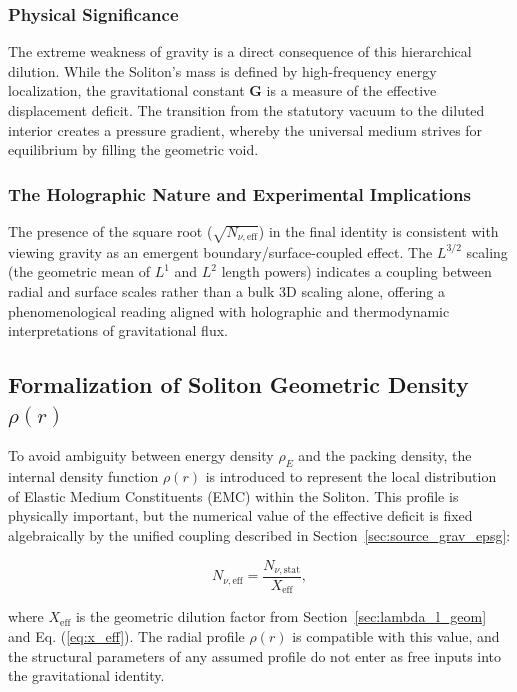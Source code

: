 \documentclass[10pt,a4paper]{article}
\begin{document}
\subsubsection*{Physical Significance}
The extreme weakness of gravity is a direct consequence of this hierarchical dilution. While the Soliton's mass is defined by high-frequency energy localization, the gravitational constant \(\mathbf{G}\) is a measure of the effective displacement deficit. The transition from the statutory vacuum to the diluted interior creates a pressure gradient, whereby the universal medium strives for equilibrium by filling the geometric void.

\subsubsection*{The Holographic Nature and Experimental Implications}
The presence of the square root (\(\sqrt{N_{\nu,\text{eff}}}\)) in the final identity is consistent with viewing gravity as an emergent boundary/surface-coupled effect. The \(L^{3/2}\) scaling (the geometric mean of \(L^1\) and \(L^2\) length powers) indicates a coupling between radial and surface scales rather than a bulk 3D scaling alone, offering a phenomenological reading aligned with holographic and thermodynamic interpretations of gravitational flux.

\subsection{Formalization of Soliton Geometric Density \(\rho(r)\)}
\label{sec:rho_r}

To avoid ambiguity between energy density \(\rho_E\) and the packing density, the internal density function \(\rho(r)\) is introduced to represent the local distribution of Elastic Medium Constituents (EMC) within the Soliton. This profile is physically important, but the numerical value of the effective deficit is fixed algebraically by the unified coupling described in Section~\ref{sec:source_grav_epsg}:

\begin{equation}
	N_{\nu,\text{eff}} = \frac{N_{\nu,\text{stat}}}{X_{\text{eff}}},
	\label{eq:N_nu_effective_sol}
\end{equation}

where \(X_{\text{eff}}\) is the geometric dilution factor from Section~\ref{sec:lambda_l_geom} and Eq. (\ref{eq:x_eff}). The radial profile \(\rho(r)\) is compatible with this value, and the structural parameters of any assumed profile do not enter as free inputs into the gravitational identity.
\end{document}
